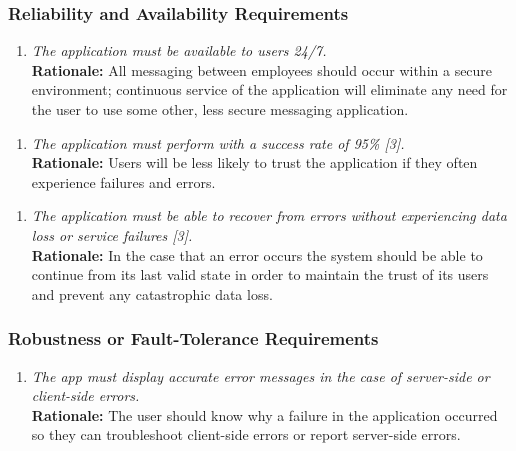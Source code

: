 \documentclass[]{article}
\begin{document}
\begin{enumerate}[{\bf BE1.}]
\subsubsection{Reliability and Availability Requirements}
\label{ssub:reliability_and_availability_requirements}
\begin{enumerate}[{PR-RA}1. ]
    \item \emph{The application must be available to users 24/7.}\\
        {\bf Rationale:} All messaging between employees should occur within a secure environment; continuous service of the application will eliminate any need for the user to use some other, less secure messaging application.
\end{enumerate}
\begin{enumerate}[{PR-RA}2. ]
    \item \emph{The application must perform with a success rate of 95\% [3].}\\
        {\bf Rationale:} Users will be less likely to trust the application if they often experience failures and errors.
\end{enumerate}
\begin{enumerate}[{PR-RA}3. ]
    \item \emph{The application must be able to recover from errors without experiencing data loss or service failures [3].}\\
        {\bf Rationale:} In the case that an error occurs the system should be able to continue from its last valid state in order to maintain the trust of its users and prevent any catastrophic data loss.
\end{enumerate}


\subsubsection{Robustness or Fault-Tolerance Requirements}
\label{ssub:robustness_or_fault_tolerance_requirements}
\begin{enumerate}[{PR-RFT}1. ]
    \item \emph{The app must display accurate error messages in the case of server-side or client-side errors.}\\
    {\bf Rationale:} The user should know why a failure in the application occurred so they can troubleshoot client-side errors or report server-side errors.
\end{enumerate}



\end{enumerate}
\end{document}
